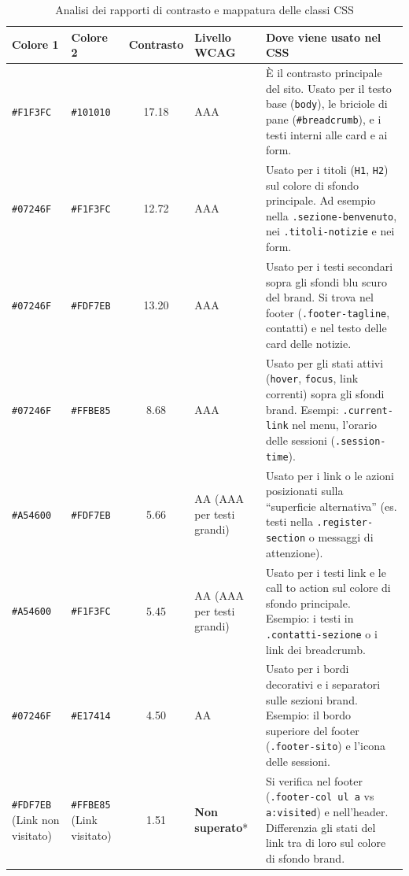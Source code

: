 \documentclass[11pt,a4paper]{article}
\begin{document}
\begin{table}[htbp]
\centering
\small
\renewcommand{\tabularxcolumn}[1]{m{#1}}
\begin{tabularx}{\textwidth}{|
 >{\centering\arraybackslash}m{2cm}| 
  >{\centering\arraybackslash}m{2.5cm}| 
  c| 
  >{\centering\arraybackslash}m{2cm}| 
  >{\centering\arraybackslash}X|}
\hline
\textbf{Colore 1} & \textbf{Colore 2} & \textbf{Contrasto} & \textbf{Livello WCAG} & \textbf{Dove viene usato nel CSS} \\
\hline
\texttt{\#F1F3FC} & \texttt{\#101010} & 17.18 & AAA & È il contrasto principale del sito. Usato per il testo base (\texttt{body}), le briciole di pane (\texttt{\#breadcrumb}), e i testi interni alle card e ai form. \\
\hline
\texttt{\#07246F} & \texttt{\#F1F3FC} & 12.72 & AAA & Usato per i titoli (\texttt{H1}, \texttt{H2}) sul colore di sfondo principale. Ad esempio nella \texttt{.sezione-benvenuto}, nei \texttt{.titoli-notizie} e nei form. \\
\hline
\texttt{\#07246F} & \texttt{\#FDF7EB}  & 13.20 & AAA & Usato per i testi secondari sopra gli sfondi blu scuro del brand. Si trova nel footer (\texttt{.footer-tagline}, contatti) e nel testo delle card delle notizie. \\
\hline
\texttt{\#07246F} & \texttt{\#FFBE85} & 8.68 & AAA & Usato per gli stati attivi (\texttt{hover}, \texttt{focus}, link correnti) sopra gli sfondi brand. Esempi: \texttt{.current-link} nel menu, l'orario delle sessioni (\texttt{.session-time}). \\
\hline
\texttt{\#A54600} & \texttt{\#FDF7EB} & 5.66 & AA \newline \scriptsize(AAA per testi grandi) & Usato per i link o le azioni posizionati sulla ``superficie alternativa'' (es. testi nella \texttt{.register-section} o messaggi di attenzione). \\
\hline
\texttt{\#A54600} & \texttt{\#F1F3FC} & 5.45 & AA \newline \scriptsize(AAA per testi grandi) & Usato per i testi link e le call to action sul colore di sfondo principale. Esempio: i testi in \texttt{.contatti-sezione} o i link dei breadcrumb. \\
\hline
\texttt{\#07246F} & \texttt{\#E17414} & 4.50 & AA & Usato per i bordi decorativi e i separatori sulle sezioni brand. Esempio: il bordo superiore del footer (\texttt{.footer-sito}) e l'icona delle sessioni. \\
\hline
\texttt{\#FDF7EB} \newline \scriptsize(Link non visitato) & \texttt{\#FFBE85} \newline \scriptsize(Link visitato) & 1.51 & \textbf{Non superato}* & Si verifica nel footer (\texttt{.footer-col ul a} vs \texttt{a:visited}) e nell'header. Differenzia gli stati del link tra di loro sul colore di sfondo brand. \\
\hline
\end{tabularx}

\vspace{0.2cm} %
\caption{Analisi dei rapporti di contrasto e mappatura delle classi CSS}
\label{tab:contrasti_colore}
\end{table}
\newpage
\end{document}
